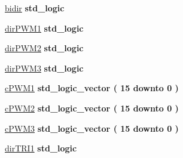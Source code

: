\begin{DoxyCompactItemize}
\item 
\hyperlink{class_d_e0___n_a_n_o___v_f_1_1_m_a_i_n_a42ebdf4696d12bb464c07323a15cf795}{bidir} {\bfseries \textcolor{comment}{std\+\_\+logic}\textcolor{vhdlchar}{ }} 
\item 
\hyperlink{class_d_e0___n_a_n_o___v_f_1_1_m_a_i_n_afeb1030d6b39bba20d43f1014679dde2}{dir\+P\+W\+M1} {\bfseries \textcolor{comment}{std\+\_\+logic}\textcolor{vhdlchar}{ }} 
\item 
\hyperlink{class_d_e0___n_a_n_o___v_f_1_1_m_a_i_n_a1508ba29dddf17c5b76a2f0f7ed4ce2e}{dir\+P\+W\+M2} {\bfseries \textcolor{comment}{std\+\_\+logic}\textcolor{vhdlchar}{ }} 
\item 
\hyperlink{class_d_e0___n_a_n_o___v_f_1_1_m_a_i_n_a4e57a67e14112fc504635d94387241f1}{dir\+P\+W\+M3} {\bfseries \textcolor{comment}{std\+\_\+logic}\textcolor{vhdlchar}{ }} 
\item 
\hyperlink{class_d_e0___n_a_n_o___v_f_1_1_m_a_i_n_a92ea2ec0415709592d72b9e06102ae37}{c\+P\+W\+M1} {\bfseries \textcolor{comment}{std\+\_\+logic\+\_\+vector}\textcolor{vhdlchar}{ }\textcolor{vhdlchar}{(}\textcolor{vhdlchar}{ }\textcolor{vhdlchar}{ } \textcolor{vhdldigit}{15} \textcolor{vhdlchar}{ }\textcolor{keywordflow}{downto}\textcolor{vhdlchar}{ }\textcolor{vhdlchar}{ } \textcolor{vhdldigit}{0} \textcolor{vhdlchar}{ }\textcolor{vhdlchar}{)}\textcolor{vhdlchar}{ }} 
\item 
\hyperlink{class_d_e0___n_a_n_o___v_f_1_1_m_a_i_n_a021d67511a5149673a690eb34c6a4d25}{c\+P\+W\+M2} {\bfseries \textcolor{comment}{std\+\_\+logic\+\_\+vector}\textcolor{vhdlchar}{ }\textcolor{vhdlchar}{(}\textcolor{vhdlchar}{ }\textcolor{vhdlchar}{ } \textcolor{vhdldigit}{15} \textcolor{vhdlchar}{ }\textcolor{keywordflow}{downto}\textcolor{vhdlchar}{ }\textcolor{vhdlchar}{ } \textcolor{vhdldigit}{0} \textcolor{vhdlchar}{ }\textcolor{vhdlchar}{)}\textcolor{vhdlchar}{ }} 
\item 
\hyperlink{class_d_e0___n_a_n_o___v_f_1_1_m_a_i_n_afb8e9b21f517cf5857d0e055b97e2f77}{c\+P\+W\+M3} {\bfseries \textcolor{comment}{std\+\_\+logic\+\_\+vector}\textcolor{vhdlchar}{ }\textcolor{vhdlchar}{(}\textcolor{vhdlchar}{ }\textcolor{vhdlchar}{ } \textcolor{vhdldigit}{15} \textcolor{vhdlchar}{ }\textcolor{keywordflow}{downto}\textcolor{vhdlchar}{ }\textcolor{vhdlchar}{ } \textcolor{vhdldigit}{0} \textcolor{vhdlchar}{ }\textcolor{vhdlchar}{)}\textcolor{vhdlchar}{ }} 
\item 
\hyperlink{class_d_e0___n_a_n_o___v_f_1_1_m_a_i_n_a520fdf898b8436bc57dda10672361534}{dir\+T\+R\+I1} {\bfseries \textcolor{comment}{std\+\_\+logic}\textcolor{vhdlchar}{ }} 

\end{DoxyCompactItemize}
